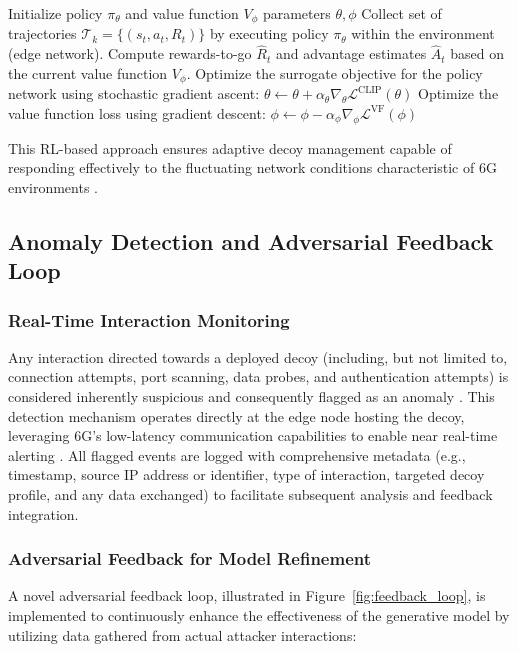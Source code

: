 \documentclass{article}
\begin{document}
\begin{algorithm}
\caption{Dynamic Decoy Management using PPO}
\label{alg:ppo_rl}
\begin{algorithmic}[1]
\Require Initialize policy \(\pi_\theta\) and value function \(V_\phi\) parameters \(\theta, \phi\)
    \State Collect set of trajectories \(\mathcal{T}_k = \{(s_t, a_t, R_t)\}\) by executing policy \(\pi_\theta\) within the environment (edge network).
    \State Compute rewards-to-go \(\hat{R}_t\) and advantage estimates \(\hat{A}_t\) based on the current value function \(V_\phi\).
        \State Optimize the surrogate objective for the policy network using stochastic gradient ascent:
        \State \( \theta \leftarrow \theta + \alpha_\theta \nabla_\theta \mathcal{L}^{\text{CLIP}}(\theta) \)
        \State Optimize the value function loss using gradient descent:
        \State \( \phi \leftarrow \phi - \alpha_\phi \nabla_\phi \mathcal{L}^{\text{VF}}(\phi) \)
    \EndFor
\EndFor
\end{algorithmic}
\end{algorithm}

This RL-based approach ensures adaptive decoy management capable of responding effectively to the fluctuating network conditions characteristic of 6G environments \cite{Shen2021AdaptiveADAC}.

\subsection{Anomaly Detection and Adversarial Feedback Loop}
\subsubsection{Real-Time Interaction Monitoring}
Any interaction directed towards a deployed decoy (including, but not limited to, connection attempts, port scanning, data probes, and authentication attempts) is considered inherently suspicious and consequently flagged as an anomaly \cite{Ferrag2023GenerativeAFB}. This detection mechanism operates directly at the edge node hosting the decoy, leveraging 6G's low-latency communication capabilities to enable near real-time alerting \cite{Rzym2024DynamicTAAB}. All flagged events are logged with comprehensive metadata (e.g., timestamp, source IP address or identifier, type of interaction, targeted decoy profile, and any data exchanged) to facilitate subsequent analysis and feedback integration.

\subsubsection{Adversarial Feedback for Model Refinement}
A novel adversarial feedback loop, illustrated in Figure~\ref{fig:feedback_loop}, is implemented to continuously enhance the effectiveness of the generative model by utilizing data gathered from actual attacker interactions:
\end{document}

